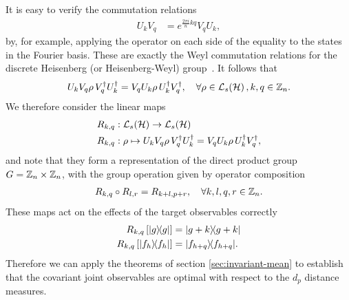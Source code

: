 It is easy to verify the commutation relations
\begin{align}
  U_k V_q  &= e^{\frac{2\pi i}{n} kq}  V_q U_k,
\end{align}
by, for example, applying the operator on each side of the equality to the states in the Fourier basis. These are exactly the Weyl commutation relations for the discrete Heisenberg (or Heisenberg-Weyl) group~\cite{hall-quantum-theory}. It follows that
\begin{align}
  U_k V_q \rho\, V_q^\dagger U^\dagger_k = V_q U_k \rho\,  U^\dagger_k V_q^\dagger, \quad \forall \rho\in\saops[\hcal],k,q\in\Z_n.
\end{align}
We therefore consider the linear maps
\begin{align}
  R_{k,q}&:\saops[\hcal]\to \saops[\hcal]\\
  R_{k,q}&:\rho \mapsto U_k V_q \rho\, V^\dagger_q U^\dagger_k =  V_q U_k  \rho\,  U^\dagger_k V^\dagger_q,
\end{align}
and note that they form a representation of the direct product group $G=\cyc[n]\times\cyc[n]$, with the group operation given by operator composition
\begin{align}
  R_{k,q} \circ R_{l,r} = R_{k+l, p+r}, \quad \forall k,l,q,r\in \cyc[n].
\end{align}
These maps act on the effects of the target observables correctly
\begin{align}
  R_{k,q}\left[|g\rangle\!\langle g|\right] &=  |g+k\rangle\!\langle g+k|\\
  R_{k,q}\left[|f_h\rangle\!\langle f_h|\right] &=  |f_{h+q}\rangle\!\langle f_{h+q}|.
\end{align}
Therefore we can apply the theorems of section \ref{sec:invariant-mean} to establish that the covariant joint observables are optimal with respect to the $d_p$ distance measures.

